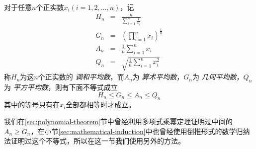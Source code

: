 \begin{theorem}[均值不等式]
  对于任意$n$个正实数$x_{i}(i=1,2,\ldots,n)$，记
  \begin{eqnarray}
    \label{eq:definition-of-average}
    H_n &=& \frac{n}{\sum_{i=1}^n \frac{1}{x_i}} \\
    G_n &=& (\prod_{i=1}^nx_{i})^{\frac{1}{n}} \\
    A_n &=& \frac{1}{n}\sum_{i=1}^{n}x_i \\
    Q_n &=& \sqrt{\frac{1}{n}\sum_{i=1}^nx_i^2}
  \end{eqnarray}
  称$H_{n}$为这$n$个正实数的 \emph{调和平均数}，而$A_{n}$为 \emph{算术平均数}，$G_n$为 \emph{几何平均数}，$Q_{n}$为 \emph{平方平均数}，则有下面不等式成立
  \begin{equation}
    \label{eq:mean-inequation-general}
    H_{n} \leqslant G_{n} \leqslant A_{n} \leqslant Q_{n}
  \end{equation}
  其中的等号只有在$x_{i}$全部都相等时才成立。
\end{theorem}

我们在\ref{sec:polynomial-theorem}节中曾经利用多项式乘幂定理证明过中间的$A_n \geqslant G_n$，在小节\ref{sec:mathematical-induction}中也曾经使用倒推形式的数学归纳法证明过这个不等式，所以在这一节我们使用另外的方法。

